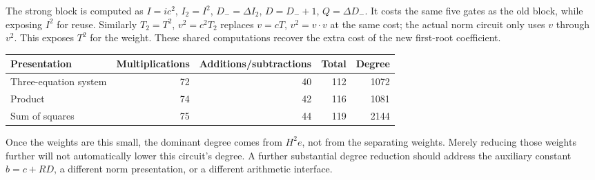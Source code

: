 The strong block is computed as
$I=ic^2$, $I_2=I^2$, $D_-=\Delta I_2$, $D=D_-+1$, $Q=\Delta D_-$.
It costs the same five gates as the old block, while exposing $I^2$ for
reuse. Similarly $T_2=T^2$, $v^2=c^2T_2$ replaces $v=cT$, $v^2=v\cdot v$
at the same cost; the actual norm circuit only uses $v$ through $v^2$.
This exposes $T^2$ for the weight. These shared computations recover the
extra cost of the new first-root coefficient.
\begin{center}
\begin{tabular}{lrrrr}
\toprule
Presentation & Multiplications & Additions/subtractions & Total & Degree\\
\midrule
Three-equation system & 72 & 40 & 112 & 1072\\
Product & 74 & 42 & 116 & 1081\\
Sum of squares & 75 & 44 & 119 & 2144\\
\bottomrule
\end{tabular}
\end{center}
Once the weights are this small, the dominant degree comes from $H^2e$,
not from the separating weights. Merely reducing those weights further
will not automatically lower this circuit's degree. A further substantial
degree reduction should address the auxiliary constant $b=c+RD$, a
different norm presentation, or a different arithmetic interface.
